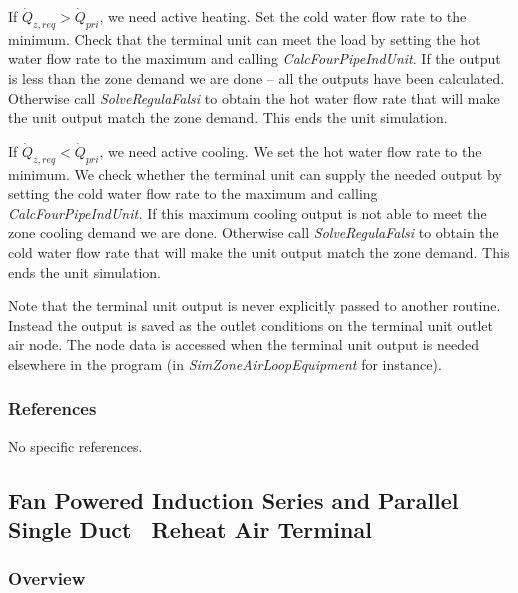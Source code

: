 If \({\dot Q_{z,req}} > {\dot Q_{pri}}\), we need active heating. Set the cold water flow rate to the minimum. Check that the terminal unit can meet the load by setting the hot water flow rate to the maximum and calling \emph{CalcFourPipeIndUnit}. If the output is less than the zone demand we are done -- all the outputs have been calculated. Otherwise call \emph{SolveRegulaFalsi} to obtain the hot water flow rate that will make the unit output match the zone demand. This ends the unit simulation.

If \({\dot Q_{z,req}} < {\dot Q_{pri}}\), we need active cooling. We set the hot water flow rate to the minimum. We check whether the terminal unit can supply the needed output by setting the cold water flow rate to the maximum and calling \emph{CalcFourPipeIndUnit.} If this maximum cooling output is not able to meet the zone cooling demand we are done. Otherwise call \emph{SolveRegulaFalsi} to obtain the cold water flow rate that will make the unit output match the zone demand. This ends the unit simulation.

Note that the terminal unit output is never explicitly passed to another routine. Instead the output is saved as the outlet conditions on the terminal unit outlet air node. The node data is accessed when the terminal unit output is needed elsewhere in the program (in \emph{SimZoneAirLoopEquipment} for instance).

\subsubsection{References}\label{references-1-000}

No specific references.

\subsection{Fan Powered Induction Series and Parallel Single Duct~ Reheat Air Terminal}\label{fan-powered-induction-series-and-parallel-single-duct-reheat-air-terminal}

\subsubsection{Overview}\label{overview-1-000}


